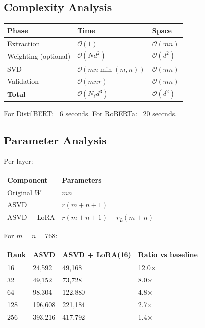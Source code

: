 \subsection{Complexity Analysis}

\begin{table}[H]
\centering
\small
\begin{tabular}{lll}
\toprule
\textbf{Phase} & \textbf{Time} & \textbf{Space} \\
\midrule
Extraction & $\mathcal{O}(1)$ & $\mathcal{O}(m n)$ \\
Weighting (optional) & $\mathcal{O}(N d^2)$ & $\mathcal{O}(d^2)$ \\
SVD & $\mathcal{O}(m n \min(m, n))$ & $\mathcal{O}(m n)$ \\
Validation & $\mathcal{O}(m n r)$ & $\mathcal{O}(m n)$ \\
\textbf{Total} & $\mathcal{O}(N_\ell d^3)$ & $\mathcal{O}(d^2)$ \\
\bottomrule
\end{tabular}
\end{table}

For DistilBERT: ~6 seconds.
For RoBERTa: ~20 seconds.

\subsection{Parameter Analysis}

Per layer:

\begin{table}[H]
\centering
\small
\begin{tabular}{ll}
\toprule
\textbf{Component} & \textbf{Parameters} \\
\midrule
Original $W$ & $m n$ \\
ASVD & $r(m + n + 1)$ \\
ASVD + LoRA & $r(m + n + 1) + r_L(m + n)$ \\
\bottomrule
\end{tabular}
\end{table}

For $m = n = 768$:

\begin{table}[H]
\centering
\small
\begin{tabular}{llll}
\toprule
\textbf{Rank} & \textbf{ASVD} & \textbf{ASVD + LoRA(16)} & \textbf{Ratio vs baseline} \\
\midrule
16 & 24,592 & 49,168 & 12.0$\times$ \\
32 & 49,152 & 73,728 & 8.0$\times$ \\
64 & 98,304 & 122,880 & 4.8$\times$ \\
128 & 196,608 & 221,184 & 2.7$\times$ \\
256 & 393,216 & 417,792 & 1.4$\times$ \\
\bottomrule
\end{tabular}
\end{table}

